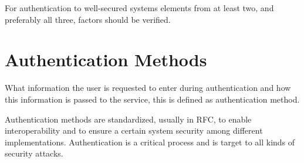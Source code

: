 \documentclass[11pt]{report}
\begin{document}
For authentication to well-secured systems elements from at least two,
and preferably all three, factors should be verified.


\section{Authentication Methods}

What information the user is requested to enter during authentication
and how this information is passed to the service, this is defined as
authentication method.

Authentication methods are standardized, usually in RFC, to enable
interoperability and to ensure a certain system security among different
implementations.  Authentication is a critical process and is target to
all kinds of security attacks.
\end{document}
